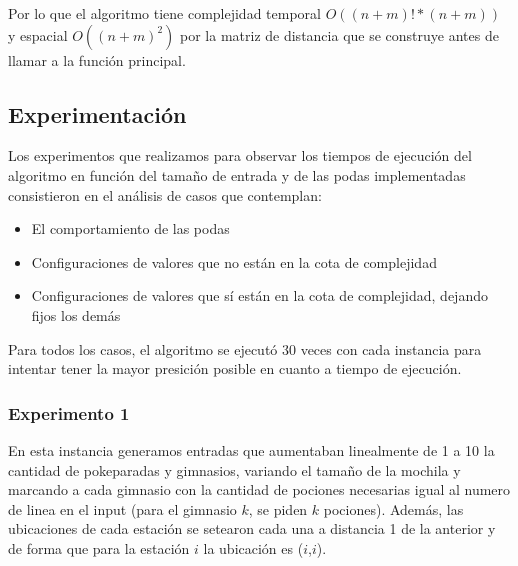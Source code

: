       Por lo que el algoritmo tiene complejidad temporal $O((n+m)! * (n+m))$ y espacial $O((n+m)^2)$ por la matriz de distancia que se construye antes de llamar a la función principal.


    \subsection{Experimentación}

      Los experimentos que realizamos para observar los tiempos de ejecución del algoritmo en función del tamaño de entrada y de las podas implementadas consistieron en el análisis de casos que contemplan:

      \begin{itemize}
        \item El comportamiento de las podas
        \item Configuraciones de valores que no están en la cota de complejidad
        \item Configuraciones de valores que sí están en la cota de complejidad, dejando fijos los demás
      \end{itemize}

      Para todos los casos, el algoritmo se ejecutó 30 veces con cada instancia para intentar tener la mayor presición posible en cuanto a tiempo de ejecución.

      \subsubsection{Experimento 1}
      En esta instancia generamos entradas que aumentaban linealmente de 1 a 10 la cantidad de pokeparadas y gimnasios, variando el tamaño de la mochila y marcando a cada gimnasio con la cantidad de pociones necesarias igual al numero de linea en el input (para el gimnasio $k$, se piden $k$ pociones). Además, las ubicaciones de cada estación se setearon cada una a distancia 1 de la anterior y de forma que para la estación $i$ la ubicación es ($i$,$i$).

